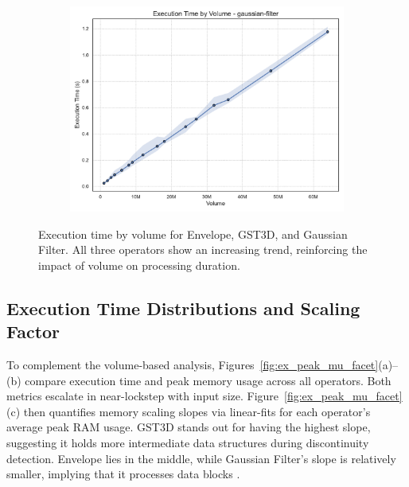\begin{figure}[htbp]
\begin{subfigure}[t]{0.49\textwidth}
        \includegraphics[width=\textwidth]{assets/images/05/execution_time_by_volume_gaussian-filter}
    \end{subfigure}
    \caption{
        Execution time by volume for Envelope, \ac{GST3D}, and Gaussian Filter. 
        All three operators show an increasing trend, reinforcing the impact of volume on processing duration. 
        \label{fig:execution_time_by_volume_facet}
    }
\end{figure}

\subsection{Execution Time Distributions and Scaling Factor}
\label{subsec:execution-time-distributions-and-scaling}

To complement the volume-based analysis, Figures~\ref{fig:ex_peak_mu_facet}(a)--(b) compare execution time and peak memory usage across all operators.
Both metrics escalate in near-lockstep with input size.
Figure~\ref{fig:ex_peak_mu_facet}(c) then quantifies memory scaling slopes via linear-fits for each operator’s average peak \ac{RAM} usage. 
\ac{GST3D} stands out for having the highest slope, suggesting it holds more intermediate data structures during discontinuity detection.
Envelope lies in the middle, while Gaussian Filter’s slope is relatively smaller, implying that it processes data blocks .

